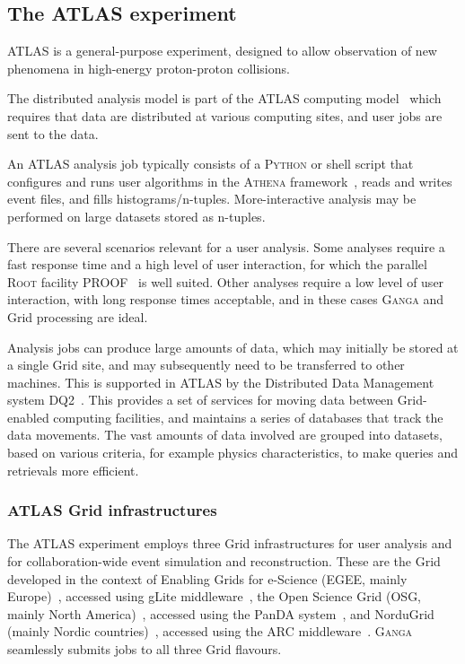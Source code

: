 \documentclass{elsart}
\def\atlas {ATLAS\xspace}
\def\ganga {\textsc{Ganga}\xspace}
\def\python {\textsc{Python}\xspace}
\def\root {\textsc{Root}\xspace}
\def\athena {\textsc{Athena}\xspace}
\def\grid {Grid\xspace}
\begin{document}
\subsection{The \atlas experiment}
\label{sec:atlas}

\atlas is a general-purpose experiment, designed to allow observation of new
phenomena in high-energy proton-proton collisions.

The distributed analysis model is part of the \atlas computing
model~\cite{bib:atlascompmod} which requires that data are distributed at
various computing sites, and user jobs are sent to the data.

An \atlas analysis job typically consists of a \python
or shell script that configures and runs user algorithms in the \athena
framework~\cite{bib:atlascompmod}, reads and writes event files, and
fills histograms/n-tuples. More-interactive analysis may be performed on
large datasets stored as n-tuples.

There are several scenarios relevant for a user analysis.  Some analyses require
a fast response time and a high level of user interaction, for which the
parallel \root facility PROOF~\cite{ballintijn_2006} is well suited.  Other
analyses require a low level of user interaction, with long response times
acceptable, and in these cases \ganga and \grid processing are ideal.

Analysis jobs can produce large amounts of data, which may initially be
stored at a single \grid site, and may subsequently need to be transferred
to other machines.  This is supported in \atlas by the Distributed Data
Management system DQ2~\cite{bib:atlasdq2}.  This provides
a set of services for moving data between \grid-enabled computing facilities,
and maintains a series of databases that track the data movements.  The
vast amounts of data involved are grouped into datasets, based on various
criteria, for example physics characteristics, to make queries and retrievals
more efficient.

\subsubsection{\atlas \grid infrastructures}

The \atlas experiment employs three \grid infrastructures for user
analysis and for collaboration-wide event simulation and reconstruction. These
are the \grid developed in the context of Enabling  Grids for e-Science
(EGEE, mainly Europe)~\cite{jones_2005}, accessed using gLite
middleware~\cite{andreetto_2008}, the Open Science Grid (OSG, mainly North
America)~\cite{OSG}, accessed using the PanDA system~\cite{maeno_2008}, and
NorduGrid (mainly Nordic countries)~\cite{ellert_2003}, accessed using the
ARC middleware~\cite{ellert_2007}.  \ganga seamlessly submits jobs to all
three \grid flavours.
\end{document}

